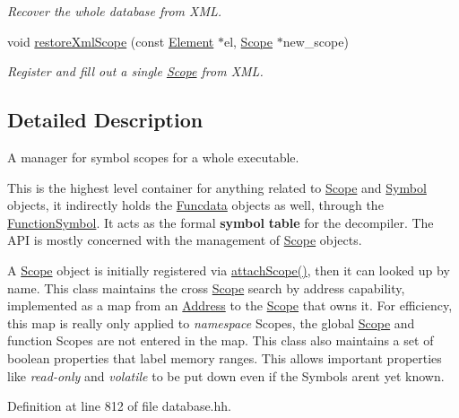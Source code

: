\begin{DoxyCompactItemize}
\begin{DoxyCompactList}\small\item\em Recover the whole database from X\+ML. \end{DoxyCompactList}\item 
void \mbox{\hyperlink{class_database_a2ced34f8773df5ae0df973a6f84c1495}{restore\+Xml\+Scope}} (const \mbox{\hyperlink{class_element}{Element}} $\ast$el, \mbox{\hyperlink{class_scope}{Scope}} $\ast$new\+\_\+scope)
\begin{DoxyCompactList}\small\item\em Register and fill out a single \mbox{\hyperlink{class_scope}{Scope}} from X\+ML. \end{DoxyCompactList}\end{DoxyCompactItemize}


\subsection{Detailed Description}
A manager for symbol scopes for a whole executable. 

This is the highest level container for anything related to \mbox{\hyperlink{class_scope}{Scope}} and \mbox{\hyperlink{class_symbol}{Symbol}} objects, it indirectly holds the \mbox{\hyperlink{class_funcdata}{Funcdata}} objects as well, through the \mbox{\hyperlink{class_function_symbol}{Function\+Symbol}}. It acts as the formal {\bfseries{symbol}} {\bfseries{table}} for the decompiler. The A\+PI is mostly concerned with the management of \mbox{\hyperlink{class_scope}{Scope}} objects.

A \mbox{\hyperlink{class_scope}{Scope}} object is initially registered via \mbox{\hyperlink{class_database_a1bc096166a8cfde3d77229c9e38bfabf}{attach\+Scope()}}, then it can looked up by name. This class maintains the cross \mbox{\hyperlink{class_scope}{Scope}} search by address capability, implemented as a map from an \mbox{\hyperlink{class_address}{Address}} to the \mbox{\hyperlink{class_scope}{Scope}} that owns it. For efficiency, this map is really only applied to {\itshape namespace} Scopes, the global \mbox{\hyperlink{class_scope}{Scope}} and function Scopes are not entered in the map. This class also maintains a set of boolean properties that label memory ranges. This allows important properties like {\itshape read-\/only} and {\itshape volatile} to be put down even if the Symbols aren\textquotesingle{}t yet known. 

Definition at line 812 of file database.\+hh.



